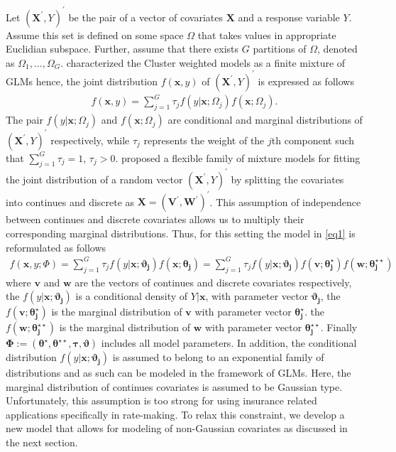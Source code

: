 \documentclass[11pt,letterpaper]{article}
\numberwithin{equation}{section}
\numberwithin{equation}{section}
\numberwithin{equation}{section}
\begin{document}
Let $(\bm{X^{'}}, Y)^{'}$  be the pair of a vector of covariates  $\bm{X}$ and a response variable $Y$. Assume this set is defined on some space $\Omega$ that takes values in appropriate Euclidian subspace. Further, assume that there exists $G$ partitions of $\Omega$, denoted as $\Omega_1, \ldots, \Omega_G$.  \cite{Gershenfeld:1997} characterized the Cluster weighted models as a finite mixture of GLMs hence, the joint distribution $f(\bm x, y)$ of $(\bm{X^{'}}, Y )^{'}$  is expressed as follows
 \begin{align}
 f(\bm x, y)= \sum_{j=1}^{G} \tau_j f(y|\bm{x};\Omega_j)f(\bm{x};\Omega_j).
\label{eq1}
\end{align}
\flushleft The pair $f(y|\bm{x};\Omega_j)$ and $f(\bm{x};\Omega_j)$ are conditional and marginal distributions of $(\bm{X^{'}}, Y)^{'}$ respectively, while $\tau_j$ represents the weight of the $j$th component such that $\sum_{j=1}^{G}\tau_j=1$, $\tau_j>0$.
\cite{Ingrassia+Punzo+Vittadini+Minotti:2015} proposed a flexible family of mixture models for fitting the joint distribution of a random vector $(\bm{X^{'}}, Y)^{'}$ by splitting the covariates into continues and discrete as $ \bm{X}=(\bm{V^{'}},  \bm{W^{'}})^{'}$. This assumption of independence between continues and discrete covariates allows us to multiply their corresponding marginal distributions. Thus, for this setting the model in \eqref{eq1} is reformulated as follows
\begin{align}
 f(\bm x, y; \Phi)= \sum_{j=1}^{G} \tau_j f(y|\bm{x};\bm{\vartheta_j})f(\bm{x};\bm{\theta_j})=\sum_{j=1}^{G} \tau_j f(y|\bm{x};\bm{\vartheta_j})f(\bm{v}; \bm{\theta_j^{\star}})f(\bm{w};\bm{\theta_j^{\star\star}})
\label{eq2}
\end{align}
where $\bm{v}$ and $\bm{w}$ are the vectors of continues and discrete covariates respectively, the $f(y|\bm{x};\bm{\vartheta_j})$ is a conditional density of $Y|\bm{x}$, with parameter vector $\bm{\vartheta_j}$, the $f(\bm{v};\bm{\theta_j^{\star}})$ is the marginal distribution of $\bm{v}$ with parameter vector $\bm{\theta_j^{\star}}$. the $f(\bm{w};\bm{\theta_j^{\star\star}})$ is the marginal distribution of $\bm{w}$ with parameter vector $\bm{\theta_j^{\star\star}}$. Finally $\bm{\Phi}:=(\bm{\theta^{\star}},\bm{\theta^{\star\star}}, \bm{\tau}, \bm{\vartheta})$ includes all model parameters. %
In addition, the conditional distribution $f(y|\bm{x};\bm{\vartheta_j})$ is assumed to belong to an exponential family of distributions and as such can be modeled in the framework of GLMs. Here, the marginal distribution of continues covariates is assumed to be Gaussian type. Unfortunately, this assumption is too strong for using insurance related applications specifically in rate-making. To relax this constraint, we develop a new model that allows for modeling of non-Gaussian covariates as discussed in the next section.
\end{document}
